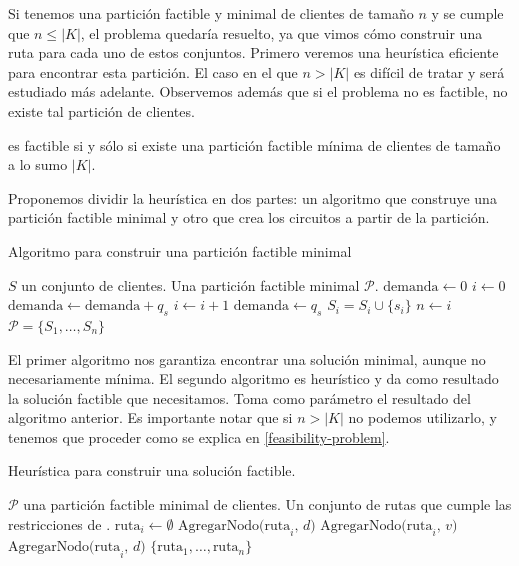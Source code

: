 Si tenemos una partición factible y minimal de clientes de tamaño $n$ y se cumple que $n \leq |K|$, el problema quedaría resuelto, ya que vimos cómo construir una ruta para cada uno de estos conjuntos. Primero veremos una heurística eficiente para encontrar esta partición. El caso en el que $n > |K|$ es difícil de tratar y será estudiado más adelante. Observemos además que si el problema no es factible, no existe tal partición de clientes.

\begin{observation}
    \label{obs:heuristic-observation}
     es factible si y sólo si existe una partición factible mínima de clientes de tamaño a lo sumo $|K|$.
\end{observation}

Proponemos dividir la heurística en dos partes: un algoritmo que construye una partición factible minimal y otro que crea los circuitos a partir de la partición.

\begin{algorithm}[H]
  \caption{Algoritmo para construir una partición factible minimal}
  \label{al:feasible_minimal_partition_algorithm}
  \begin{algorithmic}[1]
  	\Require $S$ un conjunto de clientes.
  	\Ensure Una partición factible minimal $\mathscr{P}$.
        \State $\text{demanda} \gets 0$
        \State $i \gets 0$
            \State $\text{demanda} \gets \text{demanda} + q_s$
                \State $i \gets i + 1$
                \State $\text{demanda} \gets q_s$
            \EndIf
            \State $S_i = S_i \cup \{s_i\}$
        \EndFor
        \State $n \gets i$
	\Return $\mathscr{P} = \{S_1, \dots, S_n\}$
  \end{algorithmic}
\end{algorithm}

El primer algoritmo nos garantiza encontrar una solución minimal, aunque no necesariamente mínima. El segundo algoritmo es heurístico y da como resultado la solución factible que necesitamos. Toma como parámetro el resultado del algoritmo anterior. Es importante notar que si $n > |K|$ no podemos utilizarlo, y tenemos que proceder como se explica en \ref{feasibility-problem}.

\begin{algorithm}[H]
  \caption{Heurística para construir una solución factible.}
  \label{al:feasible_solution_heuristic}
  \begin{algorithmic}[1]
  	\Require $\mathscr{P}$ una partición factible minimal de clientes.
  	\Ensure Un conjunto de rutas que cumple las restricciones de .
            \State $\text{ruta}_i \gets \emptyset$
            \State $\text{AgregarNodo(ruta}_i \text{, } d \text{)}$
                \State $\text{AgregarNodo(ruta}_i \text{, } v \text{)}$
            \EndFor
            \State $\text{AgregarNodo(ruta}_i \text{, } d \text{)}$
        \EndFor
	\Return $\{\text{ruta}_1, \dots, \text{ruta}_n\}$
  \end{algorithmic}
\end{algorithm}

